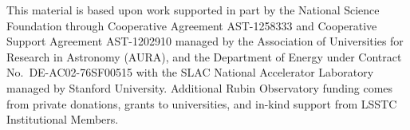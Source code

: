 \documentclass[11pt,twoside]{article}
\begin{document}
\acknowledgements This material is based upon work supported in part by
the National Science Foundation through Cooperative Agreement AST-1258333
and Cooperative Support Agreement AST-1202910 managed by the Association
of Universities for Research in Astronomy (AURA), and the Department
of Energy under Contract No.\ DE-AC02-76SF00515 with the SLAC National
Accelerator Laboratory managed by Stanford University. Additional Rubin
Observatory funding comes from private donations, grants to universities,
and in-kind support from LSSTC Institutional Members.





\end{document}
